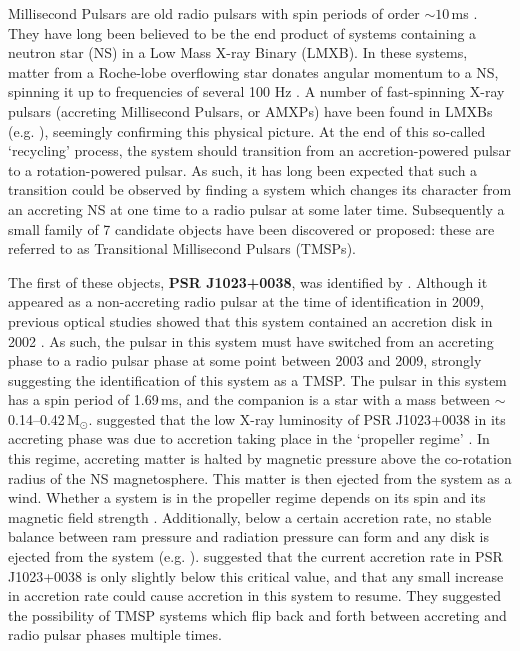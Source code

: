 \par Millisecond Pulsars are old radio pulsars with spin periods of order $\sim10$\,ms \citep{Backer_MSP}. They have long been believed to be the end product of systems containing a neutron star (NS) in a Low Mass X-ray Binary (LMXB). In these systems, matter from a Roche-lobe overflowing star donates angular momentum to a NS, spinning it up to frequencies of several 100 Hz \citep{Alpar_MSP}. A number of fast-spinning X-ray pulsars (accreting Millisecond Pulsars, or AMXPs) have been found in LMXBs (e.g. \citealp{Wijnands_XRPulsar,Altamirano_Broken,Patruno_AllAMXPs,Sanna_AMXP}), seemingly confirming this physical picture. At the end of this so-called `recycling' process, the system should transition from an accretion-powered pulsar to a rotation-powered pulsar. As such, it has long been expected that such a transition could be observed by finding a system which changes its character from an accreting NS at one time to a radio pulsar at some later time. Subsequently a small family of 7 candidate objects have been discovered or proposed: these are referred to as Transitional Millisecond Pulsars (TMSPs).
\par The first of these objects, \textbf{PSR J1023+0038}, was identified by \citealp{Archibald_Link}. Although it appeared as a non-accreting radio pulsar at the time of identification in 2009, previous optical studies showed that this system contained an accretion disk in 2002 \citep{Szkody_1023Accretion}. As such, the pulsar in this system must have switched from an accreting phase to a radio pulsar phase at some point between 2003 and 2009, strongly suggesting the identification of this system as a TMSP. The pulsar in this system has a spin period of 1.69\,ms, and the companion is a star with a mass between $\sim$0.14--0.42\,M$_\odot$. \citealp{Archibald_Link} suggested that the low X-ray luminosity of PSR J1023+0038 in its accreting phase was due to accretion taking place in the `propeller regime' \citep{Illarionov_Propellor}. In this regime, accreting matter is halted by magnetic pressure above the co-rotation radius of the NS magnetosphere. This matter is then ejected from the system as a wind. Whether a system is in the propeller regime depends on its spin and its magnetic field strength \citep{Lewin_QPORev}. Additionally, below a certain accretion rate, no stable balance between ram pressure and radiation pressure can form and any disk is ejected from the system (e.g. \citealp{Campana_NoDisk}). \citealp{Archibald_Link} suggested that the current accretion rate in PSR J1023+0038 is only slightly below this critical value, and that any small increase in accretion rate could cause accretion in this system to resume. They suggested the possibility of TMSP systems which flip back and forth between accreting and radio pulsar phases multiple times.
